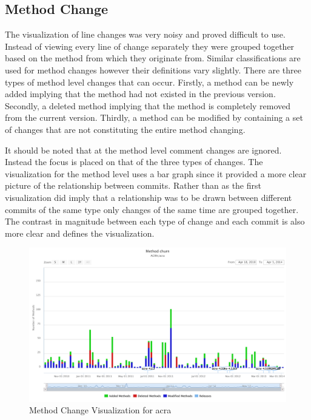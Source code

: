 \subsection{Method Change}

The visualization of line changes was very noisy and proved difficult to use. Instead of viewing every line of change separately they were grouped together based on the method from which they originate from. Similar classifications are used for method changes however their definitions vary slightly. There are three types of method level changes that can occur. Firstly, a method can be newly added implying that the method had not existed in the previous version. Secondly, a deleted method implying that the method is completely removed from the current version. Thirdly, a method can be modified by containing a set of changes that are not constituting the entire method changing. 

It should be noted that at the method level comment changes are ignored. Instead the focus is placed on that of the three types of changes. The visualization for the method level uses a bar graph since it provided a more clear picture of the relationship between commits. Rather than as the first visualization did imply that a relationship was to be drawn between different commits of the same type only changes of the same time are grouped together. The contrast in magnitude between each type of change and each commit is also more clear and defines the visualization.

\begin{figure}[!ht]
    \centering
        \includegraphics[width=1.0\textwidth]{images/method_visual_acra}
    \caption{Method Change Visualization for acra}
    \label{fig:method_visual_acra}
\end{figure}

